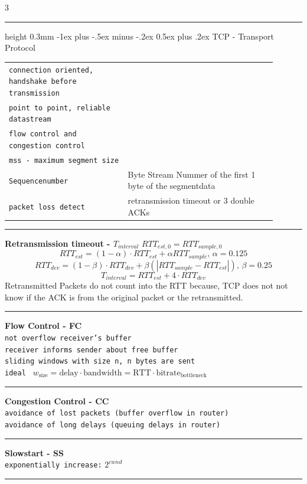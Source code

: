 \documentclass[10pt,landscape]{article}
\makeatletter
\renewcommand{\section}{\@startsection{section}{1}{0mm}%
                                {-1ex plus -.5ex minus -.2ex}%
                                {0.5ex plus .2ex}%
                                {\normalfont\large\bfseries}}
\makeatother
\begin{document}
\begin{multicols}{3}
\hrule height 0.3mm 
\vspace{0.1cm}
\section{TCP - Transport Protocol}
\begin{tabular}{p{0.40\linewidth}p{0.50\linewidth}}
\verb!connection oriented, handshake before transmission! &  \\
\verb!point to point, reliable datastream!  &  \\
\verb!flow control and congestion control! & \\
\verb!mss - maximum segment size! & \\
\hline
\verb!Sequencenumber! & Byte Stream Nummer of the first 1 byte of the segmentdata \\
\verb!packet loss detect! & retransmission timeout or 3 double ACKs \\
\end{tabular}
\hrule
\textbf{Retransmission timeout - $T_{interval}$}
$RTT_{est,0} = RTT_{sample,0}$
\[
RTT_{est} = (1-\alpha)\cdot RTT_{est} + \alpha RTT_{sample}\text{, } \alpha=0.125
\]
\[
RTT_{dev} = (1-\beta)\cdot RTT_{dev} + \beta (|RTT_{sample}-RTT_{est}|)\text{, }\beta=0.25
\]
\[
T_{interval} = RTT_{est} + 4 \cdot RTT_{dev}
\]
Retransmitted Packets do not count into the RTT because, TCP does not not know if the ACK is from the original packet or the retransmitted.
\hrule
\vspace{1cm}
\textbf{Flow Control - FC} \\
\texttt{not overflow receiver's buffer} \\
\texttt{receiver informs sender about free buffer} \\
\texttt{sliding windows with size n, n bytes are sent} \\
\texttt{ideal } $w_{\text{size}} = \text{delay} \cdot \text{bandwidth} = \text{RTT} \cdot \text{bitrate}_{\text{bottleneck}}$
\hrule

\textbf{Congestion Control - CC} \\
\texttt{avoidance of lost packets (buffer overflow in router)} \\
\texttt{avoidance of long delays (queuing delays in router)}
\hrule

\textbf{Slowstart - SS} \\
\texttt{exponentially increase:} $2^{cwnd}$
\hrule


\end{multicols}
\end{document}
